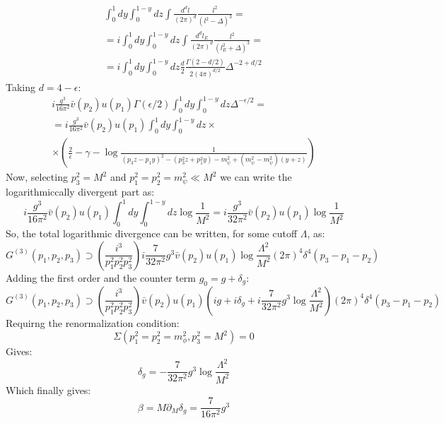 \documentclass{article}
\begin{document}
\begin{equation}
\begin{gathered}
    \int_0^1 dy \int _0^{1-y} dz \int \frac{d^dl}{(2\pi)^d} \frac{l^2}{\left(l^2 - \Delta\right)^3} = \\ =
    i\int_0^1 dy \int _0^{1-y} dz \int \frac{d^dl_E}{(2\pi)^d} \frac{l^2}{\left(l_E^2 + \Delta\right)^3} = \\ =
    i\int_0^1 dy \int _0^{1-y} dz \frac{d}{2} \frac{\Gamma(2 - d/2)}{2(4\pi)^{d/2}} \Delta^{-2+d/2}
\end{gathered}
\end{equation}
Taking $d = 4 - \epsilon$:
\begin{equation}
\begin{gathered}
    i\frac{g^3}{16\pi^2}\bar{v}(p_2) u(p_1) \Gamma(\epsilon/2) \int_0^1 dy \int _0^{1-y} dz \Delta^{-\epsilon/2} = \\ = i\frac{g^3}{16\pi^2}\bar{v}(p_2) u(p_1)\int_0^1 dy \int _0^{1-y} dz \times \\ \times \left(
        \frac{2}{\epsilon} - \gamma - \log \frac{1}{(p_3z - p_1y)^2 - (p_3^2z + p_1^2y)- m_\psi^2 + (m_\psi^2 - m_\psi^2)(y + z)}
    \right)
\end{gathered}
\end{equation}
Now, selecting $p_3^2 = M^2$ and $p_1^2=  p_2^2 = m_\psi^2 \ll M^2$ we can write the logarithmiccally divergent part as:
\begin{equation}
    i\frac{g^3}{16\pi^2}\bar{v}(p_2) u(p_1) \int_0^1 dy \int _0^{1-y} dz \log \frac{1}{M^2} = 
    i\frac{g^3}{32\pi^2}\bar{v}(p_2) u(p_1) \log \frac{1}{M^2}
\end{equation}
So, the total logarithmic divergence can be written, for some cutoff $\Lambda$, as:
\begin{equation}
    G^{(3)}(p_1, p_2, p_3) \supset \left(\frac{i^3}{p_1^2 p_2^2 p_3^2}\right)i\frac{7}{32\pi^2}g^3\bar{v}(p_2) u(p_1) \log \frac{\Lambda^2}{M^2} (2\pi)^4 \delta^4(p_3 - p_1 - p_2)
\end{equation}
Adding the first order and the counter term $g_0 = g + \delta_g$:
\begin{equation}
    G^{(3)}(p_1, p_2, p_3) \supset \left(\frac{i^3}{p_1^2 p_2^2 p_3^2}\right)\bar{v}(p_2) u(p_1)\left(ig + i\delta_g +
        i\frac{7}{32\pi^2}g^3 \log \frac{\Lambda^2}{M^2}
    \right) (2\pi)^4 \delta^4(p_3 - p_1 - p_2)
\end{equation}
Requirng the renormalization condition:
\begin{equation}
    \Sigma(p_1^2 = p_2^2 = m_\phi^2, p_3^2 = M^2) = 0
\end{equation}
Gives:
\begin{equation}
    \delta_g = -\frac{7}{32\pi^2}g^3 \log \frac{\Lambda^2}{M^2}
\end{equation}
Which finally gives:
\begin{equation}
    \beta = M\partial_M \delta_g = \frac{7}{16\pi^2}g^3 
\end{equation}
\end{document}
